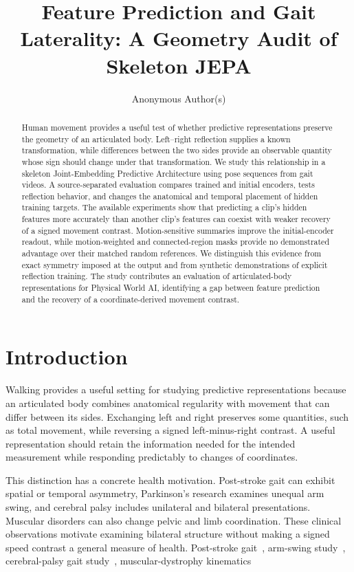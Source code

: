 \documentclass{article}
\title{Feature Prediction and Gait Laterality: A Geometry Audit of Skeleton JEPA}
\author{Anonymous Author(s)}
\begin{document}
\maketitle
\begin{abstract}
Human movement provides a useful test of whether predictive representations preserve the geometry of an articulated body. Left--right reflection supplies a known transformation, while differences between the two sides provide an observable quantity whose sign should change under that transformation. We study this relationship in a skeleton Joint-Embedding Predictive Architecture using pose sequences from gait videos. A source-separated evaluation compares trained and initial encoders, tests reflection behavior, and changes the anatomical and temporal placement of hidden training targets. The available experiments show that predicting a clip's hidden features more accurately than another clip's features can coexist with weaker recovery of a signed movement contrast. Motion-sensitive summaries improve the initial-encoder readout, while motion-weighted and connected-region masks provide no demonstrated advantage over their matched random references. We distinguish this evidence from exact symmetry imposed at the output and from synthetic demonstrations of explicit reflection training. The study contributes an evaluation of articulated-body representations for Physical World AI, identifying a gap between feature prediction and the recovery of a coordinate-derived movement contrast.
\end{abstract}
\section{Introduction}\label{introduction}

Walking provides a useful setting for studying predictive representations because an articulated body combines anatomical regularity with movement that can differ between its sides. Exchanging left and right preserves some quantities, such as total movement, while reversing a signed left-minus-right contrast. A useful representation should retain the information needed for the intended measurement while responding predictably to changes of coordinates.

This distinction has a concrete health motivation. Post-stroke gait can exhibit spatial or temporal asymmetry, Parkinson's research examines unequal arm swing, and cerebral palsy includes unilateral and bilateral presentations. Muscular disorders can also change pelvic and limb coordination. These clinical observations motivate examining bilateral structure without making a signed speed contrast a general measure of health. Post-stroke gait~\citep{ref01}, arm-swing study~\citep{ref02}, cerebral-palsy gait study~\citep{ref03}, muscular-dystrophy kinematics~\citep{ref04}
\end{document}
